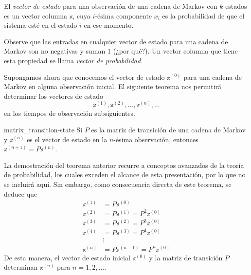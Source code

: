 \begin{definicion}{}{}
    El \emph{vector de estado} para una observación de una cadena de Markov con $k$ estados es un vector columna $\mathbb{x}$, cuya $i$-ésima componente $x_i$ es la probabilidad de que el sistema esté en el estado $i$ en ese momento.
\end{definicion}

Observe que las entradas en cualquier vector de estado para una cadena de Markov son no negativas y suman $1$ (¿por qué?). Un vector columna que tiene esta propiedad se llama \emph{vector de probabilidad}.

Supongamos ahora que conocemos el vector de estado $\mathbb{x}^{(0)}$ para una cadena de Markov en alguna observación inicial. El siguiente teorema nos permitirá determinar los vectores de estado
$$\mathbb{x}^{(1)}, \mathbb{x}^{(2)}, \dots, \mathbb{x}^{(n)}, \dots$$
en los tiempos de observación subsiguientes.

\begin{theorem}{}{matrix_transition-state}
    Si $P$ es la matriz de transición de una cadena de Markov y $\mathbb{x}^{(n)}$ es el vector de estado en la $n$-ésima observación, entonces $\mathbb{x}^{(n+1)} = P \mathbb{x}^{(n)}$.
\end{theorem}

La demostración del teorema anterior recurre a conceptos avanzados de la teoría de probabilidad, los cuales exceden el alcance de esta presentación, por lo que no se incluirá aquí. Sin embargo, como consecuencia directa de este teorema, se deduce que
\begin{align*}
    \mathbb{x}^{(1)} & = P\mathbb{x}^{(0)} \\
    \mathbb{x}^{(2)} & = P\mathbb{x}^{(1)} = P^2\mathbb{x}^{(0)} \\
    \mathbb{x}^{(3)} & = P\mathbb{x}^{(2)} = P^3\mathbb{x}^{(0)} \\
    \mathbb{x}^{(4)} & = P\mathbb{x}^{(3)} = P^4\mathbb{x}^{(0)} \\
    & \vdots \\
    \mathbb{x}^{(n)} & = P\mathbb{x}^{(n-1)} = P^n\mathbb{x}^{(0)}
\end{align*}
De esta manera, el vector de estado inicial $\mathbb{x}^{(0)}$ y la matriz de transición $P$ determinan $\mathbb{x}^{(n)}$ para $n = 1, 2, \dots$.

